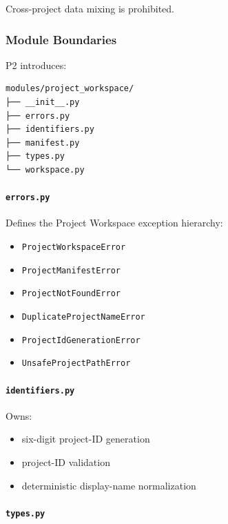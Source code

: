 Cross-project data mixing is prohibited.

\hypertarget{module-boundaries}{%
\subsubsection{Module Boundaries}\label{module-boundaries}}

P2 introduces:

\begin{verbatim}
modules/project_workspace/
├── __init__.py
├── errors.py
├── identifiers.py
├── manifest.py
├── types.py
└── workspace.py
\end{verbatim}

\hypertarget{errorspy}{%
\paragraph{\texorpdfstring{\texttt{errors.py}}{errors.py}}\label{errorspy}}

Defines the Project Workspace exception hierarchy:

\begin{itemize}
\tightlist
\item
  \texttt{ProjectWorkspaceError}
\item
  \texttt{ProjectManifestError}
\item
  \texttt{ProjectNotFoundError}
\item
  \texttt{DuplicateProjectNameError}
\item
  \texttt{ProjectIdGenerationError}
\item
  \texttt{UnsafeProjectPathError}
\end{itemize}

\hypertarget{identifierspy}{%
\paragraph{\texorpdfstring{\texttt{identifiers.py}}{identifiers.py}}\label{identifierspy}}

Owns:

\begin{itemize}
\tightlist
\item
  six-digit project-ID generation
\item
  project-ID validation
\item
  deterministic display-name normalization
\end{itemize}

\hypertarget{typespy}{%
\paragraph{\texorpdfstring{\texttt{types.py}}{types.py}}\label{typespy}}

